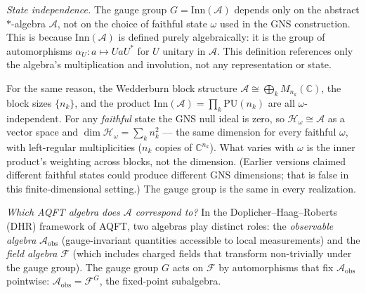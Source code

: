 \documentclass[11pt]{article}
\theoremstyle{definition}
\begin{document}
\smallskip\noindent\textit{State independence.}\quad
The gauge group $G = \mathrm{Inn}(\mathcal{A})$ depends only on the
abstract $*$-algebra $\mathcal{A}$, not on the choice of faithful state
$\omega$ used in the GNS construction.  This is because
$\mathrm{Inn}(\mathcal{A})$ is defined purely algebraically: it is the
group of automorphisms $\alpha_U: a \mapsto UaU^*$ for $U$ unitary in
$\mathcal{A}$.  This definition references only the algebra's
multiplication and involution, not any representation or state.

For the same reason, the Wedderburn block structure
$\mathcal{A} \cong \bigoplus_k M_{n_k}(\mathbb{C})$, the block sizes
$\{n_k\}$, and the product $\mathrm{Inn}(\mathcal{A}) = \prod_k
\mathrm{PU}(n_k)$ are all $\omega$-independent.  For any \emph{faithful}
state the GNS null ideal is zero, so $\mathcal{H}_\omega \cong
\mathcal{A}$ as a vector space and
$\dim \mathcal{H}_\omega = \sum_k n_k^2$ --- the same dimension for
every faithful $\omega$, with left-regular multiplicities ($n_k$ copies
of $\mathbb{C}^{n_k}$).  What varies with $\omega$ is the inner
product's weighting across blocks, not the dimension.  (Earlier
versions claimed different faithful states could produce different GNS
dimensions; that is false in this finite-dimensional setting.)  The
gauge group is the same in every realization.

\smallskip\noindent\textit{Which AQFT algebra does $\mathcal{A}$ correspond to?}\quad
In the Doplicher--Haag--Roberts (DHR) framework of AQFT, two algebras
play distinct roles: the \emph{observable algebra}
$\mathcal{A}_{\mathrm{obs}}$ (gauge-invariant quantities accessible to
local measurements) and the \emph{field algebra} $\mathcal{F}$ (which
includes charged fields that transform non-trivially under the gauge
group).  The gauge group $G$ acts on $\mathcal{F}$ by automorphisms
that fix $\mathcal{A}_{\mathrm{obs}}$ pointwise:
$\mathcal{A}_{\mathrm{obs}} = \mathcal{F}^G$, the fixed-point
subalgebra.
\end{document}
